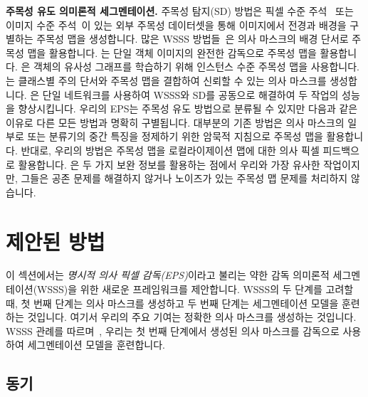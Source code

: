 \documentclass[final]{cvpr}
\begin{document}


\vspace{1mm}
\noindent\textbf{주목성 유도 의미론적 세그멘테이션.}
주목성 탐지(SD) 방법은 픽셀 수준 주석~\cite{hou2017deeply, xiao2018deep, zhao2019pyramid} 또는 이미지 수준 주석~\cite{wang2017learning}이 있는 외부 주목성 데이터셋을 통해 이미지에서 전경과 배경을 구별하는 주목성 맵을 생성합니다. 많은 WSSS 방법들~\cite{fan2020cian, huang2018weakly, lee2019ficklenet, li2018tell, wei2017object, wei2018revisiting}은 의사 마스크의 배경 단서로 주목성 맵을 활용합니다. \cite{wei2016stc}는 단일 객체 이미지의 완전한 감독으로 주목성 맵을 활용합니다. \cite{fan2018associating}은 객체의 유사성 그래프를 학습하기 위해 인스턴스 수준 주목성 맵을 사용합니다. \cite{chaudhry_dcsp_2017, wang2018weakly, yao2020saliency}는 클래스별 주의 단서와 주목성 맵을 결합하여 신뢰할 수 있는 의사 마스크를 생성합니다. \cite{zeng2019joint}은 단일 네트워크를 사용하여 WSSS와 SD를 공동으로 해결하여 두 작업의 성능을 향상시킵니다. 우리의 EPS는 주목성 유도 방법으로 분류될 수 있지만 다음과 같은 이유로 다른 모든 방법과 명확히 구별됩니다. 대부분의 기존 방법은 의사 마스크의 일부로 또는 분류기의 중간 특징을 정제하기 위한 암묵적 지침으로 주목성 맵을 활용합니다. 반대로, 우리의 방법은 주목성 맵을 로컬라이제이션 맵에 대한 의사 픽셀 피드백으로 활용합니다. \cite{zeng2019joint}은 두 가지 보완 정보를 활용하는 점에서 우리와 가장 유사한 작업이지만, 그들은 공존 문제를 해결하지 않거나 노이즈가 있는 주목성 맵 문제를 처리하지 않습니다.

\section{제안된 방법}

이 섹션에서는 \emph{명시적 의사 픽셀 감독(EPS)}이라고 불리는 약한 감독 의미론적 세그멘테이션(WSSS)을 위한 새로운 프레임워크를 제안합니다. WSSS의 두 단계를 고려할 때, 첫 번째 단계는 의사 마스크를 생성하고 두 번째 단계는 세그멘테이션 모델을 훈련하는 것입니다. 여기서 우리의 주요 기여는 정확한 의사 마스크를 생성하는 것입니다. WSSS 관례를 따르며~\cite{fan2020learning,jiang2019integral,lee2019ficklenet,li2018tell,wang2020self,wei2017object}, 우리는 첫 번째 단계에서 생성된 의사 마스크를 감독으로 사용하여 세그멘테이션 모델을 훈련합니다.

\subsection{동기}
\label{section3.1}
\end{document}
